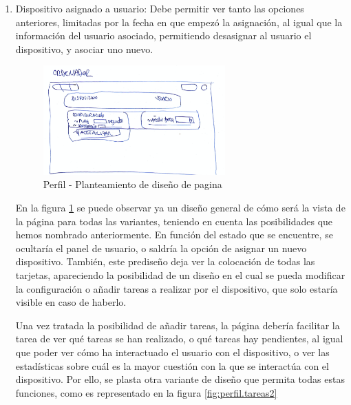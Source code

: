 \begin{enumerate}
\begin{enumerate}
        \item Dispositivo asignado a usuario:
        Debe permitir ver tanto las opciones anteriores, limitadas por la fecha en que empezó la asignación, al igual que la información del usuario asociado, permitiendo desasignar al usuario el dispositivo, y asociar uno nuevo.
        
        \begin{figure}[H]   
            \centering
            \includegraphics[width=7cm]{./img/web/perfil/device-all.pre.png}
            \caption{Perfil - Planteamiento de diseño de pagina}
            \label{fig:perfil.pag}
        \end{figure}
        
        En la figura \ref{fig:perfil.pag} se puede observar ya un diseño general de cómo será la vista de la página para todas las variantes, teniendo en cuenta las posibilidades que hemos nombrado anteriormente.
        En función del estado que se encuentre, se ocultaría el panel de usuario, o saldría la opción de asignar un nuevo dispositivo.
        También, este prediseño deja ver la colocación de todas las tarjetas, apareciendo la posibilidad de un diseño en el cual se pueda modificar la configuración o añadir tareas a realizar por el dispositivo, que solo estaría visible en caso de haberlo. 
        
        Una vez tratada la posibilidad de añadir tareas, la página debería facilitar la tarea de ver qué tareas se han realizado, o qué tareas hay pendientes, al igual que poder ver cómo ha interactuado el usuario con el dispositivo, o ver las estadísticas sobre cuál es la mayor cuestión con la que se interactúa con el dispositivo. Por ello, se plasta otra variante de diseño que permita todas estas funciones, como es representado en la figura \ref{fig:perfil.tareas2}
        

\end{enumerate}
\end{enumerate}
